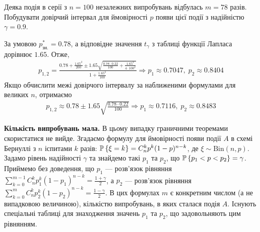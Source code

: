 \begin{example}
    Деяка подія в серії з $n=100$ незалежних випробувань відбулась $m=78$ разів. Побудувати довірчий інтервал для
    ймовірності $p$ появи цієї події з надійністю $\gamma = 0.9$.
    
    За умовою $p^*_{\text{зн.}} = 0.78$, а відповідне значення $t_{\gamma}$ з таблиці функції Лапласа дорівнює $1.65$.
    Отже,
    \begin{gather*}
        p_{1, 2} = \frac{0.78 + \frac{1.65^2}{200} \pm 1.65 \sqrt{\frac{0.78\cdot 0.22}{100} + \frac{1.65^2}{4\cdot 100^2}}}{1+\frac{1.65^2}{100}} \Rightarrow
        p_1 \approx 0.7047, \; p_2 \approx 0.8404
    \end{gather*}
    Якщо обчислити межі довірчого інтервалу за наближеними формулами для великих $n$, отримаємо
    \begin{gather*}
        p_{1, 2} \approx 0.78 \pm 1.65\sqrt{\frac{0.78\cdot 0.22}{100}} \Rightarrow p_1 \approx 0.7116, \; p_2 \approx 0.8483
    \end{gather*}
\end{example}

\noindent\textbf{Кількість випробувань мала.} 
В цьому випадку граничними теоремами скористатися не вийде. Згадаємо формулу для ймовірності появи події $A$ в схемі Бернуллі
з $n$ іспитами $k$ разів: 
$\P\left\{ \xi = k\right\} = C_n^k p^k (1-p)^{n-k}$, де $\xi\sim \mathrm{Bin}(n, p)$. 
Задамо рівень надійності $\gamma$ та знайдемо такі $p_1$ та $p_2$, що $\P\left\{p_1 < p < p_2 \right\} = \gamma$.
Приймемо без доведення, що $p_1$ --- розв'язок рівняння 
$\sum\limits_{k=0}^{m-1} C_n^k p_1^k (1-p_1)^{n-k} = \frac{1+\gamma}{2}$, а $p_2$ --- розв'язок рівняння
$\sum\limits_{k=0}^{m} C_n^k p_2^k (1-p_2)^{n-k} = \frac{1-\gamma}{2}$.
В цих формулах $m$ є конкретним числом (а не випадковою величиною), кількістю випробувань, в яких сталася подія $A$.
Існують спеціальні таблиці для знаходження значень $p_1$ та $p_2$, що задовольняють цим рівнянням.

